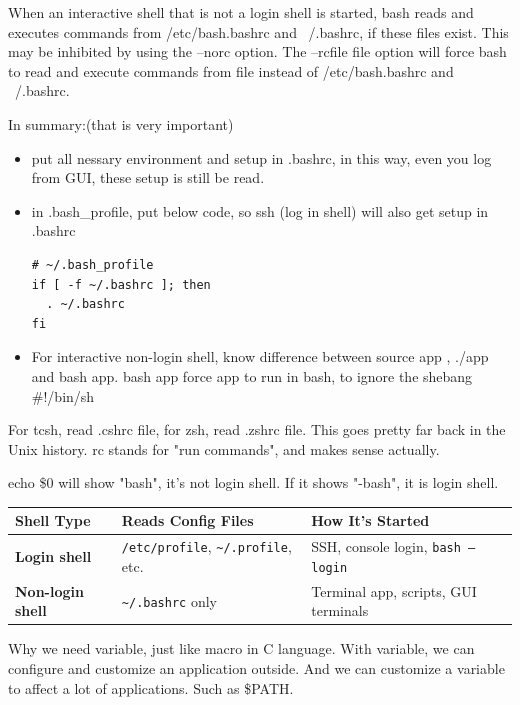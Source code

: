 \documentclass[paper=8.5in:11in, twoside, 12pt, pagesize=pdftex]{book}
\begin{document}
	\par When an interactive shell that is not a login shell is started, bash reads and executes commands from  /etc/bash.bashrc and ~/.bashrc, if these files exist. This may be inhibited by using the --norc option. The --rcfile file option will force bash to read and execute commands from file instead of /etc/bash.bashrc and  ~/.bashrc.	
	
	\par In summary:(that is very important)
\begin{itemize}
	\item put all nessary environment and setup in .bashrc, in this way, even you log from GUI, these setup is still be read.
	
	\item in .bash\_profile, put below code, so ssh (log in shell) will also get setup in .bashrc
\begin{lstlisting}
# ~/.bash_profile
if [ -f ~/.bashrc ]; then
  . ~/.bashrc
fi
\end{lstlisting}

	\item For interactive non-login shell, know difference between source app , ./app and bash app. bash app force app to run in bash, to ignore the shebang \#!/bin/sh
\end{itemize}

	\par For tcsh, read .cshrc file, for zsh, read .zshrc file. This goes pretty far back in the Unix history. rc stands for "run commands", and makes sense actually.

	\par echo \$0 will show "bash", it's not login shell. If it shows "-bash", it is login shell.  
	
	\begin{tabular}{|l|l|l|}
		\hline
		\textbf{Shell Type}       & \textbf{Reads Config Files}                         & \textbf{How It's Started}                    \\ \hline
		\textbf{Login shell}      & \texttt{/etc/profile}, \texttt{\~{}/.profile}, etc. & SSH, console login, \texttt{bash --login}   \\ \hline
		\textbf{Non-login shell}  & \texttt{\~{}/.bashrc} only                          & Terminal app, scripts, GUI terminals        \\ \hline
	\end{tabular}
	
	\par Why we need variable, just like macro in C language. With variable, we can configure and customize an application outside. And we can customize a variable to affect a lot of applications. Such as \$PATH.
				
\end{document}

